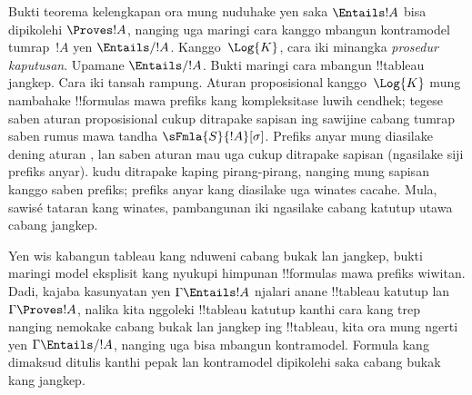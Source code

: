 \documentclass[../../../include/open-logic-section]{subfiles}
\begin{document}
      

\begin{explain}
  Bukti teorema kelengkapan ora mung nuduhake yen saka
  $\Entails !A$ bisa dipikolehi $\Proves !A$, nanging uga maringi
  cara kanggo mbangun kontramodel tumrap~$!A$ yen $\Entails/ !A$.
  Kanggo~$\Log{K}$, cara iki minangka \emph{prosedur kaputusan}.
  Upamane $\Entails/ !A$. Bukti
   maringi cara mbangun
  !!{tableau} jangkep. Cara iki tansah rampung. Aturan proposisional
  kanggo~$\Log{K}$ mung nambahake !!{formula}s mawa prefiks kang
  kompleksitase luwih cendhek; tegese saben aturan proposisional
  cukup ditrapake sapisan ing sawijine cabang tumrap saben rumus
  mawa tandha $\sFmla{S}{!A}[\sigma]$. Prefiks anyar mung diasilake
  dening aturan
  , lan saben aturan mau uga
  cukup ditrapake sapisan (ngasilake siji prefiks anyar).
   kudu ditrapake
  kaping pirang-pirang, nanging mung sapisan kanggo saben prefiks;
  prefiks anyar kang diasilake uga winates cacahe. Mula, sawisé
  tataran kang winates, pambangunan iki ngasilake cabang katutup
  utawa cabang jangkep.

  Yen wis kabangun tableau kang nduweni cabang bukak lan jangkep,
  bukti  maringi model eksplisit
  kang nyukupi himpunan !!{formula}s mawa prefiks wiwitan. Dadi,
  kajaba kasunyatan yen $\Gamma \Entails !A$ njalari anane
  !!{tableau} katutup lan $\Gamma \Proves !A$, nalika kita nggoleki
  !!{tableau} katutup kanthi cara kang trep nanging nemokake cabang
  bukak lan jangkep ing !!{tableau}, kita ora mung ngerti yen $\Gamma \Entails/ !A$,
  nanging uga bisa mbangun kontramodel.
Formula kang dimaksud ditulis kanthi pepak lan kontramodel dipikolehi saka cabang bukak kang jangkep.
\end{explain}
\end{document}
